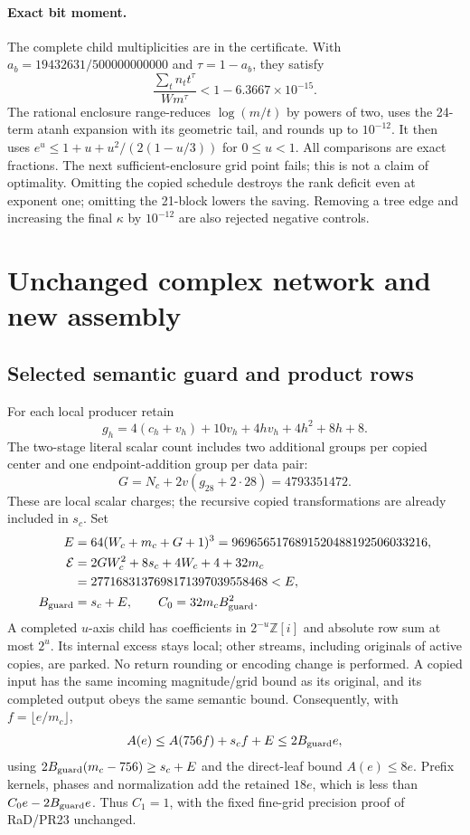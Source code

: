 \documentclass[11pt]{article}
\begin{document}
\paragraph{Exact bit moment.}
The complete child multiplicities are in the certificate. With
$a_b=19432631/500000000000$ and $\tau=1-a_b$, they satisfy
\[
 \frac{\sum_t n_t t^\tau}{Wm^\tau}
 <1-6.3667\times10^{-15}.
\]
The rational enclosure range-reduces $\log(m/t)$ by powers of two,
uses the 24-term atanh expansion with its geometric tail, and rounds
up to $10^{-12}$. It then uses
$e^u\le1+u+u^2/(2(1-u/3))$ for $0\le u<1$.
All comparisons are exact fractions. The next sufficient-enclosure grid
point fails; this is not a claim of optimality. Omitting the copied
schedule destroys the rank deficit even at exponent one; omitting the
21-block lowers the saving. Removing a tree edge and increasing the final
$\kappa$ by $10^{-12}$ are also rejected negative controls.

\section{Unchanged complex network and new assembly}

\subsection{Selected semantic guard and product rows}
For each local producer retain
\[
 g_h=4(c_h+v_h)+10v_h+4hv_h+4h^2+8h+8.
\]
The two-stage literal scalar count includes two additional groups per
copied center and one endpoint-addition group per data pair:
\[
 G=N_c+2v(g_{28}+2\cdot28)=4793351472.
\]
These are local scalar charges; the recursive copied transformations
are already included in $s_c$. Set
\[
\begin{aligned}
 E&=64(W_c+m_c+G+1)^3=9696565176891520488192506033216,\\
 \mathcal E&=2GW_c^2+8s_c+4W_c+4+32m_c\\
           &=2771683137698171397039558468<E,\\
 B_{\rm guard}&=s_c+E,\qquad C_0=32m_cB_{\rm guard}^2.
\end{aligned}
\]
A completed $u$-axis child has coefficients in $2^{-u}\mathbb Z[i]$
and absolute row sum at most $2^u$. Its internal excess stays local;
other streams, including originals of active copies, are parked.
No return rounding or encoding change is performed. A copied input
has the same incoming magnitude/grid bound as its original, and its
completed output obeys the same semantic bound. Consequently, with
$f=\lfloor e/m_c\rfloor$,
\[
 A(e)\le A(756f)+s_cf+E\le2B_{\rm guard}e,
\]
using $2B_{\rm guard}(m_c-756)\ge s_c+E$ and the direct-leaf bound
$A(e)\le8e$. Prefix kernels, phases and normalization add the retained
$18e$, which is less than $C_0e-2B_{\rm guard}e$. Thus $C_1=1$,
with the fixed fine-grid precision proof of RaD/PR23 unchanged.
\end{document}
